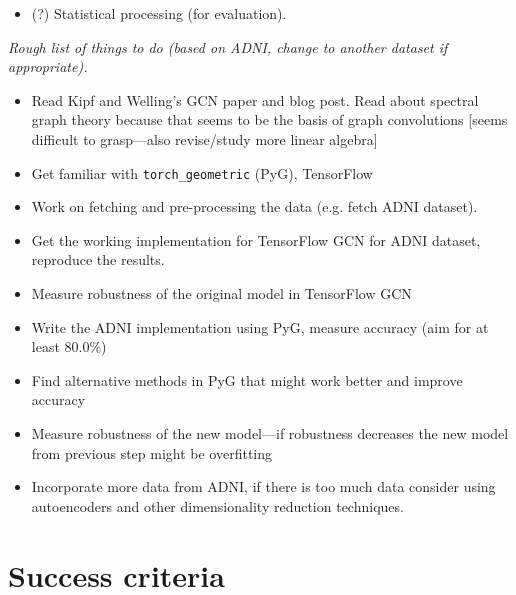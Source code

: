 \documentclass[12pt,a4paper,twoside]{article}
\begin{document}
\begin{itemize}
  \item (?) Statistical processing (for evaluation).
\end{itemize}


\textit{Rough list of things to do (based on ADNI, change to another dataset if appropriate).}
\begin{itemize}
  \item Read Kipf and Welling's GCN paper \cite{kipf2017semi} and blog post. Read about spectral graph theory because that seems to be the basis of graph convolutions [seems difficult to grasp—also revise/study more linear algebra]
  \item Get familiar with \texttt{torch\_geometric} (PyG), TensorFlow
  \item Work on fetching and pre-processing the data (e.g. fetch ADNI dataset).
  \item Get the working implementation for TensorFlow GCN for ADNI dataset, reproduce the results.
  \item Measure robustness of the original model in TensorFlow GCN
  \item Write the ADNI implementation using PyG, measure accuracy (aim for at least 80.0\%)
  \item Find alternative methods in PyG that might work better and improve accuracy
  \item Measure robustness of the new model—if robustness decreases the new model from previous step might be overfitting
  \item Incorporate more data from ADNI, if there is too much data consider using autoencoders and other dimensionality reduction techniques.
\end{itemize}

\section*{Success criteria}


\end{document}
